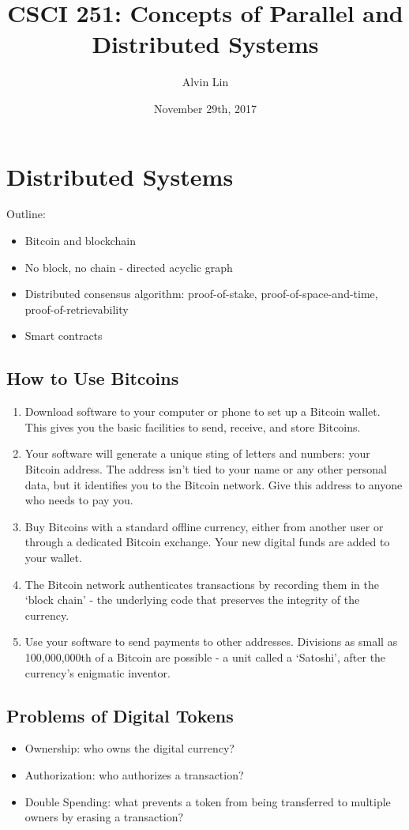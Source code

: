 \documentclass{math}
\title{CSCI 251: Concepts of Parallel and Distributed Systems}
\author{Alvin Lin}
\date{November 29th, 2017}
\begin{document}
\maketitle

\section*{Distributed Systems}
Outline:
\begin{itemize}
  \item Bitcoin and blockchain
  \item No block, no chain - directed acyclic graph
  \item Distributed consensus algorithm: proof-of-stake,
  proof-of-space-and-time, proof-of-retrievability
  \item Smart contracts
\end{itemize}

\subsection*{How to Use Bitcoins}
\begin{enumerate}
  \item Download software to your computer or phone to set up a Bitcoin wallet.
  This gives you the basic facilities to send, receive, and store Bitcoins.
  \item Your software will generate a unique sting of letters and numbers: your
  Bitcoin address. The address isn't tied to your name or any other personal
  data, but it identifies you to the Bitcoin network. Give this address to
  anyone who needs to pay you.
  \item Buy Bitcoins with a standard offline currency, either from another user
  or through a dedicated Bitcoin exchange. Your new digital funds are added to
  your wallet.
  \item The Bitcoin network authenticates transactions by recording them in the
  `block chain' - the underlying code that preserves the integrity of the
  currency.
  \item Use your software to send payments to other addresses. Divisions as
  small as 100,000,000th of a Bitcoin are possible - a unit called a
  `Satoshi', after the currency's enigmatic inventor.
\end{enumerate}

\subsection*{Problems of Digital Tokens}
\begin{itemize}
  \item Ownership: who owns the digital currency?
  \item Authorization: who authorizes a transaction?
  \item Double Spending: what prevents a token from being transferred to
  multiple owners by erasing a transaction?
\end{itemize}
\end{document}
